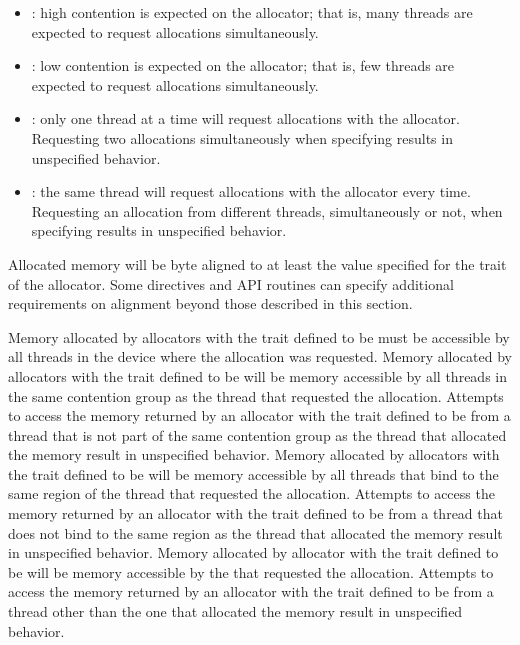 \begin{itemize}
\item {}: high contention is expected on the allocator; that 
      is, many threads are expected to request allocations simultaneously.
\item {}: low contention is expected on the allocator; that 
      is, few threads are expected to request allocations simultaneously.
\item {}: only one thread at a time will request allocations 
      with the allocator. Requesting two allocations simultaneously when 
      specifying  results in unspecified behavior.
\item {}: the same thread will request allocations with the 
      allocator every time. Requesting an allocation from different threads, 
      simultaneously or not, when specifying  results in 
      unspecified behavior.
\end{itemize}

Allocated memory will be byte aligned to at least the value specified for the 
{} trait of the allocator. Some directives and API routines
can specify additional requirements on alignment beyond those described in 
this section.

Memory allocated by allocators with the  trait defined to be 
 must be accessible by all threads in the device where the allocation 
was requested. Memory allocated by allocators with the  trait 
defined to be  will be memory accessible by all threads in the 
same contention group as the thread that requested the allocation. Attempts to 
access the memory returned by an allocator with the  trait 
defined to be  from a thread that is not part of the same 
contention group as the thread that allocated the memory result in unspecified 
behavior. Memory allocated by allocators with the  trait defined 
to be  will be memory accessible by all threads that bind to the 
same {} region of the thread that requested the allocation. Attempts 
to access the memory returned by  an allocator with the  trait 
defined to be  from a thread that does not bind to the same 
{} region as the thread that allocated the memory result 
in unspecified behavior. Memory allocated by allocator with the  
trait defined to be  will be memory accessible by the {} 
that requested the allocation. Attempts to access the memory returned by an allocator 
with the  trait defined to be  from a thread other 
than the one that allocated the memory result in unspecified behavior.

